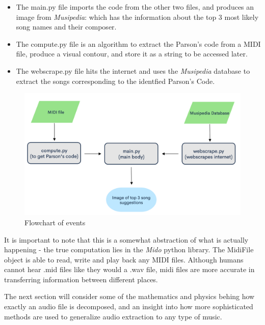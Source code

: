 \documentclass[a4paper,12pt]{article}
\begin{document}
\begin{itemize}

    \item The main.py file imports the code from the other two files, and produces an image from 
    \textit{Musipedia}: which has the information about the top 3 most likely song names and their composer.

    \item The compute.py file is an algorithm to extract the Parson's code from a MIDI file, produce a
    visual contour, and store it as a string to be accessed later.

    \item The webscrape.py file hits the internet and uses the \textit{Musipedia} database to extract
    the songs corresponding to the identfied Parson's Code.

\end{itemize}

\begin{figure}[h!]
    \centering
    \includegraphics[width=17cm]{flowchart.png}
    \caption{Flowchart of events}
\end{figure}

It is important to note that this is a somewhat abstraction of what is actually happening -
the true computation lies in the \textit{Mido} python library. The MidiFile object is able to read, write and
play back any MIDI files. Although humans cannot hear .mid files like they would a .wav file, midi files are more accurate
in transferring information between different places. 

The next section will consider some of the mathematics and physics behing how exactly an audio file is decomposed, and an insight into 
how more sophisticated methods are used to generalize audio extraction to any type of music.
\end{document}
